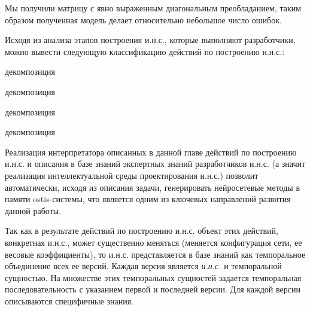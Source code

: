 Мы получили матрицу с явно выраженным диагональным преобладанием, таким образом полученная модель делает относительно небольшое число ошибок.

Исходя из анализа этапов построения и.н.с., которые выполняют разработчики, можно вывести следующую классификацию действий по построению и.н.с.:

\begin{SCn}
	\begin{scnrelfromset}{декомпозиция}
		\begin{scnrelfromset}{декомпозиция}
		\end{scnrelfromset}

		\begin{scnrelfromset}{декомпозиция}
		\end{scnrelfromset}

		\begin{scnrelfromset}{декомпозиция}
		\end{scnrelfromset}
	\end{scnrelfromset}
\end{SCn}

Реализация интерпретатора описанных в данной главе действий по построению и.н.с. и описания в базе знаний экспертных знаний разработчиков и.н.с. (а значит реализация интеллектуальной среды проектирования и.н.с.) позволит автоматически, исходя из описания задачи, генерировать нейросетевые методы в памяти ostis-системы, что является одним из ключевых направлений развития данной работы.

Так как в результате действий по построению и.н.с. объект этих действий, конкретная и.н.с., может существенно меняться (меняется конфигурация сети, ее весовые коэффициенты), то и.н.с. представляется в базе знаний как темпоральное объединение всех ее версий. Каждая версия является  \textit{и.н.с.} и темпоральной сущностью. На множестве этих темпоральных сущностей задается темпоральная последовательность с указанием первой и последней версии. Для каждой версии описываются специфичные знания.

